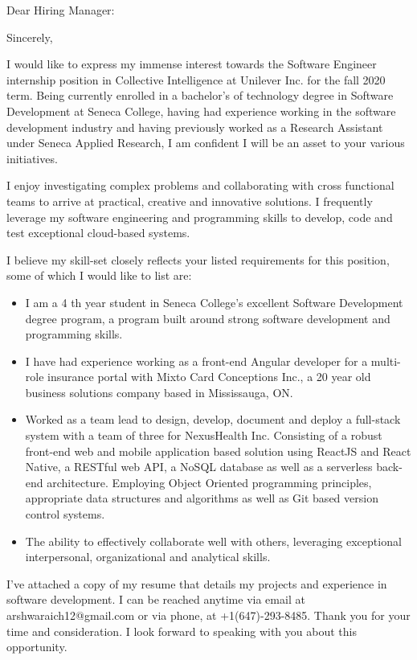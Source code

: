\documentclass[letterpaper]{moderncv}
\begin{document}
\date{\today}
\opening{Dear Hiring Manager:}
\closing{Sincerely,}
\makelettertitle

I would like to express my immense interest towards the Software Engineer internship position in Collective Intelligence at Unilever Inc. for the fall 2020 term. Being currently enrolled in a bachelor’s of technology degree in Software Development at Seneca College, having had experience working in the software development industry and having previously worked as a Research Assistant under Seneca Applied Research, I am confident I will be an asset to your various initiatives.

I enjoy investigating complex problems and collaborating with cross functional teams to arrive at practical, creative and innovative solutions. I frequently leverage my software engineering and programming skills to develop, code and test exceptional cloud-based systems.

I believe my skill-set closely reflects your listed requirements for this position, some of which I would like to list are:

{\begin{itemize}%
	\item I am a 4 th year student in Seneca College’s excellent Software Development degree program, a program built around strong software development and programming skills.
	\item I have had experience working as a front-end Angular developer for a multi-role insurance portal with Mixto Card Conceptions Inc., a 20 year old business solutions company based in Mississauga, ON.
	\item Worked as a team lead to design, develop, document and deploy a full-stack system with a team of three for NexusHealth Inc. Consisting of a robust front-end web and mobile application based solution using ReactJS and React Native, a RESTful web API, a NoSQL database as well as a serverless back-end architecture. Employing Object Oriented programming principles, appropriate data structures and algorithms as well as Git based version control systems.
	\item The ability to effectively collaborate well with others, leveraging exceptional interpersonal, organizational and analytical skills.
	\end{itemize}}
	
I’ve attached a copy of my resume that details my projects and experience in software development. I can be reached anytime via email at arshwaraich12@gmail.com or via phone, at +1(647)-293-8485. Thank you for your time and consideration. I look forward to speaking with you about this opportunity.

\makeletterclosing
\end{document}
